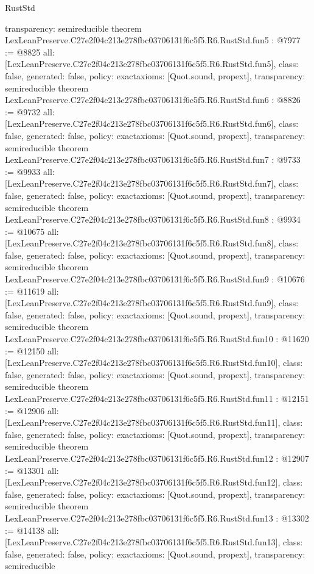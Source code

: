 \begin{lexlean}{RustStd}
\begin{coremodule}
{  transparency: semireducible
}
theorem LexLeanPreserve.C27e2f04c213e278fbc03706131f6c5f5.R6.RustStd.fun5 : @7977 := @8825 {
  all: [LexLeanPreserve.C27e2f04c213e278fbc03706131f6c5f5.R6.RustStd.fun5],
  class: false,
  generated: false,
  policy: exact{axioms: [Quot.sound, propext]},
  transparency: semireducible
}
theorem LexLeanPreserve.C27e2f04c213e278fbc03706131f6c5f5.R6.RustStd.fun6 : @8826 := @9732 {
  all: [LexLeanPreserve.C27e2f04c213e278fbc03706131f6c5f5.R6.RustStd.fun6],
  class: false,
  generated: false,
  policy: exact{axioms: [Quot.sound, propext]},
  transparency: semireducible
}
theorem LexLeanPreserve.C27e2f04c213e278fbc03706131f6c5f5.R6.RustStd.fun7 : @9733 := @9933 {
  all: [LexLeanPreserve.C27e2f04c213e278fbc03706131f6c5f5.R6.RustStd.fun7],
  class: false,
  generated: false,
  policy: exact{axioms: [Quot.sound, propext]},
  transparency: semireducible
}
theorem LexLeanPreserve.C27e2f04c213e278fbc03706131f6c5f5.R6.RustStd.fun8 : @9934 := @10675 {
  all: [LexLeanPreserve.C27e2f04c213e278fbc03706131f6c5f5.R6.RustStd.fun8],
  class: false,
  generated: false,
  policy: exact{axioms: [Quot.sound, propext]},
  transparency: semireducible
}
theorem LexLeanPreserve.C27e2f04c213e278fbc03706131f6c5f5.R6.RustStd.fun9 : @10676 := @11619 {
  all: [LexLeanPreserve.C27e2f04c213e278fbc03706131f6c5f5.R6.RustStd.fun9],
  class: false,
  generated: false,
  policy: exact{axioms: [Quot.sound, propext]},
  transparency: semireducible
}
theorem LexLeanPreserve.C27e2f04c213e278fbc03706131f6c5f5.R6.RustStd.fun10 : @11620 := @12150 {
  all: [LexLeanPreserve.C27e2f04c213e278fbc03706131f6c5f5.R6.RustStd.fun10],
  class: false,
  generated: false,
  policy: exact{axioms: [Quot.sound, propext]},
  transparency: semireducible
}
theorem LexLeanPreserve.C27e2f04c213e278fbc03706131f6c5f5.R6.RustStd.fun11 : @12151 := @12906 {
  all: [LexLeanPreserve.C27e2f04c213e278fbc03706131f6c5f5.R6.RustStd.fun11],
  class: false,
  generated: false,
  policy: exact{axioms: [Quot.sound, propext]},
  transparency: semireducible
}
theorem LexLeanPreserve.C27e2f04c213e278fbc03706131f6c5f5.R6.RustStd.fun12 : @12907 := @13301 {
  all: [LexLeanPreserve.C27e2f04c213e278fbc03706131f6c5f5.R6.RustStd.fun12],
  class: false,
  generated: false,
  policy: exact{axioms: [Quot.sound, propext]},
  transparency: semireducible
}
theorem LexLeanPreserve.C27e2f04c213e278fbc03706131f6c5f5.R6.RustStd.fun13 : @13302 := @14138 {
  all: [LexLeanPreserve.C27e2f04c213e278fbc03706131f6c5f5.R6.RustStd.fun13],
  class: false,
  generated: false,
  policy: exact{axioms: [Quot.sound, propext]},
  transparency: semireducible
}
\end{coremodule}
\end{lexlean}
